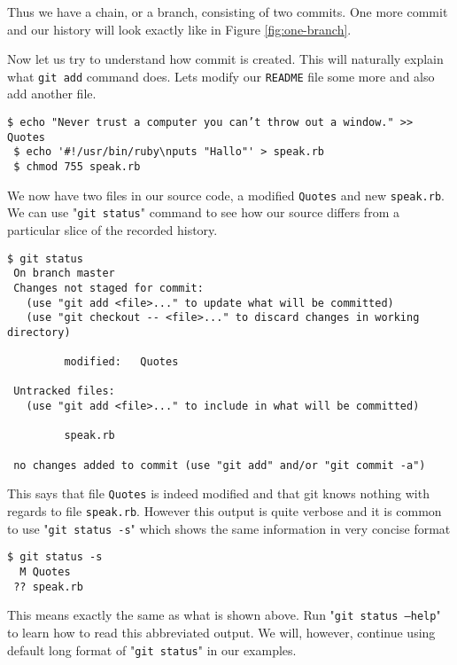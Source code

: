 \documentclass{article}
\theoremstyle{definition}
\begin{document}
        \noindent Thus we have a chain, or a branch, consisting of two commits. One more commit and our history will
        look exactly like in Figure \ref{fig:one-branch}.

        Now let us try to understand how commit is created. This will naturally explain what \texttt{git add} command
        does. Lets modify our \texttt{README} file some more and also add another file.

        \begin{Verbatim}[frame=single]
 $ echo "Never trust a computer you can’t throw out a window." >> Quotes
 $ echo '#!/usr/bin/ruby\nputs "Hallo"' > speak.rb
 $ chmod 755 speak.rb
        \end{Verbatim}
        We now have two files in our source code, a modified \texttt{Quotes} and new \texttt{speak.rb}. We can use
        "\texttt{git status}" command to see how our source differs from a particular slice of the recorded history.

        \begin{Verbatim}[frame=single]
 $ git status
 On branch master
 Changes not staged for commit:
   (use "git add <file>..." to update what will be committed)
   (use "git checkout -- <file>..." to discard changes in working directory)

         modified:   Quotes

 Untracked files:
   (use "git add <file>..." to include in what will be committed)

         speak.rb

 no changes added to commit (use "git add" and/or "git commit -a")
        \end{Verbatim}

        \noindent This says that file \texttt{Quotes} is indeed modified and that git knows nothing with regards to file
        \texttt{speak.rb}. However this output is quite verbose and it is common to use "\texttt{git status -s}" which
        shows the same information in very concise format

        \begin{Verbatim}[frame=single]
 $ git status -s
  M Quotes
 ?? speak.rb
        \end{Verbatim}
        This means exactly the same as what is shown above. Run "\texttt{git status --help}" to learn how to read this
        abbreviated output. We will, however, continue using default long format of "\texttt{git status}" in our examples.
        \newpage
\end{document}
